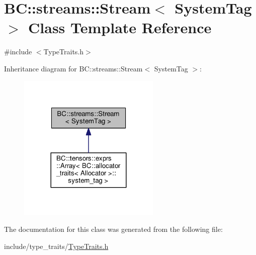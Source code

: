 \hypertarget{classBC_1_1streams_1_1Stream}{}\section{BC\+:\+:streams\+:\+:Stream$<$ System\+Tag $>$ Class Template Reference}
\label{classBC_1_1streams_1_1Stream}


{\ttfamily \#include $<$Type\+Traits.\+h$>$}



Inheritance diagram for BC\+:\+:streams\+:\+:Stream$<$ System\+Tag $>$\+:
\nopagebreak
\begin{figure}[H]
\begin{center}
\leavevmode
\includegraphics[width=192pt]{classBC_1_1streams_1_1Stream__inherit__graph}
\end{center}
\end{figure}


The documentation for this class was generated from the following file\+:\begin{DoxyCompactItemize}
\item 
include/type\+\_\+traits/\hyperlink{TypeTraits_8h}{Type\+Traits.\+h}\end{DoxyCompactItemize}
